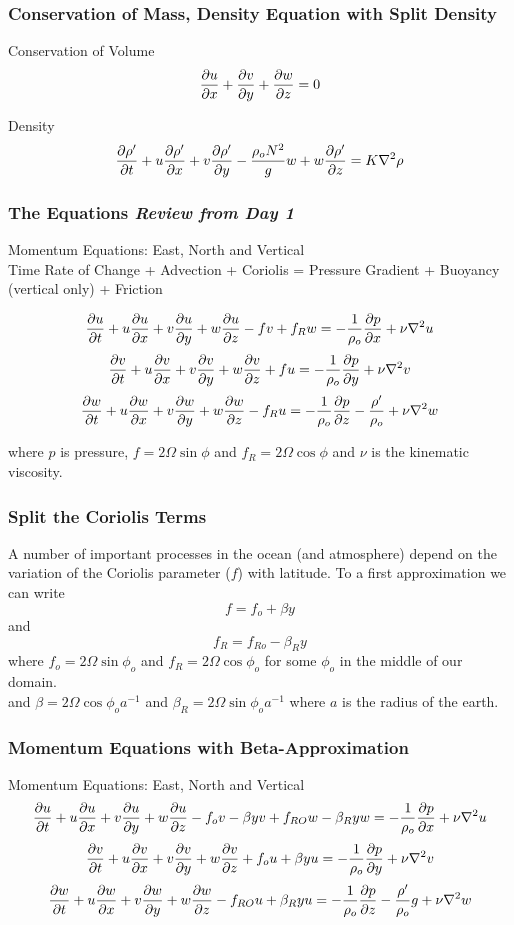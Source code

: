 \documentclass[xcolor=dvipsnames]{beamer}
\begin{document}
\begin{frame}
\frametitle{Conservation of Mass, Density Equation with Split Density}
Conservation of Volume\\
\[ \frac {\partial u}{\partial x} + \frac {\partial v}{\partial y} + \frac {\partial w}{\partial z} = 0 \]

Density\\
\[ \frac{\partial\rho^\prime}{\partial t} + u \frac{\partial\rho^\prime}{\partial x} + v \frac{\partial\rho^\prime}{\partial y} -  \frac{\rho_o N^2}g w + w \frac{\partial\rho^\prime}{\partial z} = K \nabla^2 \rho \]
\end{frame}

\begin{frame}
  \frametitle{The Equations {\it Review from Day 1}}   %
Momentum Equations: East, North and Vertical\\
Time Rate of Change + Advection + Coriolis = Pressure Gradient + Buoyancy (vertical only) + Friction


\[ \frac {\partial u}{\partial t} + u \frac {\partial u}{\partial x} + v \frac {\partial u}{\partial y} + w \frac {\partial u}{\partial z} -fv +f_R w = -\frac{1}{\rho_o} \frac {\partial p}{\partial x} + \nu \nabla^2 u\] 
\[ \frac {\partial v}{\partial t} + u \frac {\partial v}{\partial x} + v \frac {\partial v}{\partial y} + w\frac {\partial v}{\partial z} + fu = -\frac{1}{\rho_o} \frac {\partial p}{\partial y} + \nu \nabla^2 v\]
\[ \frac {\partial w}{\partial t} + u \frac {\partial w}{\partial x} + v \frac {\partial w}{\partial y} + w \frac {\partial w}{\partial z} - f_R u = -\frac{1}{\rho_o} \frac {\partial p}{\partial z} - \frac{\rho^\prime}{\rho_o} + \nu \nabla^2 w \]

where $p$ is pressure, $f = 2\Omega \sin \phi$ and $f_R = 2 \Omega \cos \phi$ and $\nu$ is the kinematic viscosity.

\end{frame}

\begin{frame}
  \frametitle{Split the Coriolis Terms}

A number of important processes in the ocean (and atmosphere) depend on the variation of the Coriolis parameter ($f$) with latitude.  To a first approximation we can write
\[ f = f_o + \beta y\]
and 
\[ f_R = f_{Ro} - \beta_R y\]
where $f_o = 2 \Omega \sin \phi_o$ and $f_R = 2 \Omega \cos \phi_o$ for some $\phi_o$ in the middle of our domain.\\
and
$\beta = 2 \Omega \cos \phi_o a^{-1}$ and $\beta_R = 2 \Omega \sin \phi_o a^{-1}$ where $a$ is the radius of the earth.
\end{frame}

\begin{frame}
  \frametitle{Momentum Equations with Beta-Approximation}   %
Momentum Equations: East, North and Vertical\\



\[ \frac {\partial u}{\partial t} + u \frac {\partial u}{\partial x} + v \frac {\partial u}{\partial y} + w \frac {\partial u}{\partial z} -f_o v - \beta y v +f_{RO} w - \beta_R y w = -\frac{1}{\rho_o} \frac {\partial p}{\partial x} + \nu \nabla^2 u\] 
\[ \frac {\partial v}{\partial t} + u \frac {\partial v}{\partial x} + v \frac {\partial v}{\partial y} + w\frac {\partial v}{\partial z} + f_o u + \beta y u = -\frac{1}{\rho_o} \frac {\partial p}{\partial y} + \nu \nabla^2 v\]
\[ \frac {\partial w}{\partial t} + u \frac {\partial w}{\partial x} + v \frac {\partial w}{\partial y} + w \frac {\partial w}{\partial z} - f_{RO} u + \beta_R y u = -\frac{1}{\rho_o} \frac {\partial p}{\partial z} - \frac{\rho^\prime}{\rho_o}g + \nu \nabla^2 w \]



\end{frame}
\end{document}
